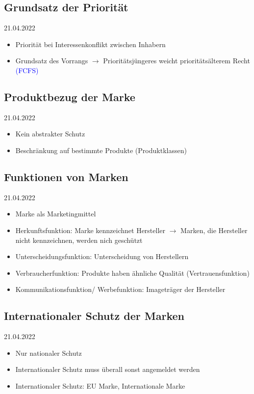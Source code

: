 \documentclass{report}
\begin{document}
\subsection{Grundsatz der Priorität}
21.04.2022
\begin{itemize}
	\item Priorität bei Interessenkonflikt zwischen Inhabern
	\item Grundsatz des Vorrangs $\rightarrow$ Prioritätsjüngeres weicht prioritätsälterem Recht \textcolor{blue}{(FCFS)}
\end{itemize}

\subsection{Produktbezug der Marke}
21.04.2022
\begin{itemize}
	\item Kein abstrakter Schutz
	\item Beschränkung auf bestimmte Produkte (Produktklassen)
\end{itemize}

\subsection{Funktionen von Marken}
21.04.2022
\begin{itemize}
	\item Marke als Marketingmittel
	\item Herkunftsfunktion: Marke kennzeichnet Hersteller
	\newline $\rightarrow$ Marken, die Hersteller nicht kennzeichnen, werden nich geschützt
	\item Unterscheidungsfunktion: Unterscheidung von Herstellern
	\item Verbraucherfunktion: Produkte haben ähnliche Qualität (Vertrauensfunktion)
	\item Kommunikationsfunktion/ Werbefunktion: Imageträger der Hersteller
\end{itemize}

\subsection{Internationaler Schutz der Marken}
21.04.2022
\begin{itemize}
	\item Nur nationaler Schutz
	\item Internationaler Schutz muss überall sonst angemeldet werden
	\item Internationaler Schutz: EU Marke, Internationale Marke
\end{itemize}
\end{document}
